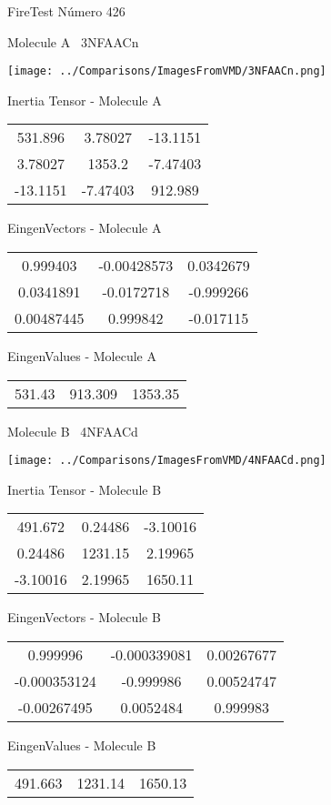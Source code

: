 \vtab[-3cm]
\begin{center}
{\large FireTest \tab Número 426}
\end{center}
\begin{multicols}{2}
\begin{center}

Molecule A \
3NFAACn

\texttt{[image: ../Comparisons/ImagesFromVMD/3NFAACn.png]}

Inertia Tensor - Molecule A \\
\begin{tabular}{|c c c|}
531.896	 & 	3.78027	 & 	-13.1151	 \\
3.78027	 & 	1353.2	 & 	-7.47403	 \\
-13.1151	 & 	-7.47403	 & 	912.989
\end{tabular}

\vtab
 EingenVectors - Molecule A     \\
\begin{tabular}{|c c c|}
0.999403	 & 	-0.00428573	 & 	0.0342679	 \\
0.0341891	 & 	-0.0172718	 & 	-0.999266	 \\
0.00487445	 & 	0.999842	 & 	-0.017115
\end{tabular}

\vtab
 EingenValues - Molecule A     \\
\begin{tabular}{|c c c|}
531.43	 & 	913.309	 & 	1353.35	 \\
\end{tabular}
\columnbreak

Molecule B \
4NFAACd

\texttt{[image: ../Comparisons/ImagesFromVMD/4NFAACd.png]}

Inertia Tensor - Molecule B \\
\begin{tabular}{|c c c|}
491.672	 & 	0.24486	 & 	-3.10016	 \\
0.24486	 & 	1231.15	 & 	2.19965	 \\
-3.10016	 & 	2.19965	 & 	1650.11
\end{tabular}

\vtab
 EingenVectors - Molecule B     \\
\begin{tabular}{|c c c|}
0.999996	 & 	-0.000339081	 & 	0.00267677	 \\
-0.000353124	 & 	-0.999986	 & 	0.00524747	 \\
-0.00267495	 & 	0.0052484	 & 	0.999983
\end{tabular}

\vtab
 EingenValues - Molecule B     \\
\begin{tabular}{|c c c|}
491.663	 & 	1231.14	 & 	1650.13	 \\
\end{tabular}

\end{center}
\end{multicols}

